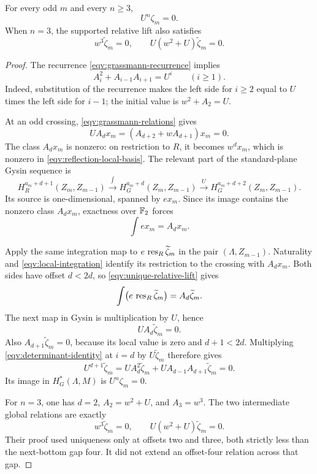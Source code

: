 \begin{lemma}
\label{eqv:odd-torsion}
For every odd \(m\) and every \(n\ge3\),
\[
 U^n\zeta_m=0.
\]
When \(n=3\), the supported relative lift also satisfies
\[
 w^3\widetilde\zeta_m=0,\qquad
 U(w^2+U)\widetilde\zeta_m=0.
\]
\end{lemma}

\begin{proof}
The recurrence \eqref{eqv:grassmann-recurrence} implies
\begin{equation}
 A_i^2+A_{i-1}A_{i+1}=U^i\qquad(i\ge1).
 \label{eqv:determinant-identity}
\end{equation}
Indeed, substitution of the recurrence makes the left side for
\(i\ge2\) equal to \(U\) times the left side for \(i-1\);
the initial value is \(w^2+A_2=U\).

At an odd crossing, \eqref{eqv:grassmann-relations} gives
\[
 UA_dx_m=(A_{d+2}+wA_{d+1})x_m=0.
\]
The class \(A_dx_m\) is nonzero: on restriction to \(R\), it becomes
\(w^dx_m\), which is nonzero in
\eqref{eqv:reflection-local-basis}.
The relevant part of the standard-plane Gysin sequence is
\[
 H_R^{a_m+d+1}(Z_m,Z_{m-1})
 \xrightarrow{\int} H_G^{a_m+d}(Z_m,Z_{m-1})
 \xrightarrow{U} H_G^{a_m+d+2}(Z_m,Z_{m-1}).
\]
Its source is one-dimensional, spanned by \(ex_m\).
Since its image contains the nonzero class \(A_dx_m\), exactness
over \(\mathbb F_2\) forces
\begin{equation}
 \int ex_m=A_dx_m.
 \label{eqv:local-integration}
\end{equation}

Apply the same integration map to
\(e\,\operatorname{res}_R\widetilde\zeta_m\) in the pair
\((\Lambda,Z_{m-1})\).
Naturality and \eqref{eqv:local-integration} identify its restriction
to the crossing with \(A_dx_m\).
Both sides have offset \(d<2d\), so
\eqref{eqv:unique-relative-lift} gives
\[
 \int\bigl(e\,\operatorname{res}_R\widetilde\zeta_m\bigr)
   =A_d\widetilde\zeta_m.
\]
The next map in Gysin is multiplication by \(U\), hence
\begin{equation}
 UA_d\widetilde\zeta_m=0.
 \label{eqv:integrated-relation}
\end{equation}
Also \(A_{d+1}\widetilde\zeta_m=0\), because its local value is zero
and \(d+1<2d\).
Multiplying \eqref{eqv:determinant-identity} at \(i=d\) by
\(U\widetilde\zeta_m\) therefore gives
\[
 U^{d+1}\widetilde\zeta_m
 =UA_d^2\widetilde\zeta_m+
   UA_{d-1}A_{d+1}\widetilde\zeta_m=0.
 \]
Its image in \(H_G^*(\Lambda,M)\) is \(U^n\zeta_m=0\).

For \(n=3\), one has \(d=2\), \(A_2=w^2+U\), and \(A_3=w^3\).
The two intermediate global relations are exactly
\[
 w^3\widetilde\zeta_m=0,\qquad
 U(w^2+U)\widetilde\zeta_m=0.
\]
Their proof used uniqueness only at offsets two and three, both
strictly less than the next-bottom gap four.
It did not extend an offset-four relation across that gap.
\end{proof}

